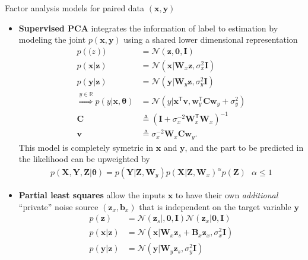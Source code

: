 Factor analysis models for paired data $(\bm{x},\bm{y})$
\begin{itemize}
    \item \textbf{Supervised PCA} integrates the information of label to estimation 
    by modeling the joint $p(\bm{x},\bm{y})$ using a shared lower dimensional representation
    \begin{align}
        p(\bm(z)) 
        & = \mathcal{N}(\bm{z},\mathbf{0},\mathbf{I}) \\
        p(\bm{x}|\bm{z})
        & = \mathcal{N}(\bm{x}|\mathbf{W}_x\bm{z},\sigma_x^2\mathbf{I}) \\
        p(\bm{y}|\bm{z})
        & = \mathcal{N}(\bm{y}|\mathbf{W}_y\bm{z},\sigma_y^2\mathbf{I}) \\
        \overset{y\in\mathbb{R}}{\Rightarrow} 
        p(y|\bm{x},\bm{\theta}) 
        & = \mathcal{N}(y|\bm{x}^\mathsf{T}\bm{v},\bm{w}_y^\mathsf{T}\mathbf{C}\bm{w}_y+\sigma_y^2) \\
        \mathbf{C}
        & \triangleq (\mathbf{I}+\sigma_x^{-2}\mathbf{W}_x^\mathsf{T}\mathbf{W}_x)^{-1} \\
        \bm{v}
        & \triangleq \sigma_x^{-2}\mathbf{W}_x\mathbf{C}\bm{w}_y.
    \end{align}
    This model is completely symetric in $\bm{x}$ and $\bm{y}$, and the part to be predicted in the likelihood can be upweighted by
    \begin{gather}
        p(\mathbf{X}, \mathbf{Y}, \mathbf{Z}|\bm{\theta}) = p(\mathbf{Y}|\mathbf{Z},\mathbf{W}_y)p(\mathbf{X}|\mathbf{Z},\mathbf{W}_x)^\alpha p(\mathbf{Z})~~~\alpha \leq 1
    \end{gather}
    
    \item \textbf{Partial least squares} allow the inputs $\bm{x}$ to have their own \textit{additional} ``private'' noise source $(\bm{z}_x,\bm{b}_x)$ that is independent on the target variable $\bm{y}$
    \begin{align}
        p(\bm{z}) 
        & = \mathcal{N}(\bm{z}_s|,\mathbf{0},\mathbf{I})\mathcal{N}(\bm{z}_x|\mathbf{0},\mathbf{I}) \\
        p(\bm{x}|\bm{z})
        & = \mathcal{N}(\bm{x}|\mathbf{W}_x\bm{z}_s+\mathbf{B}_x\bm{z}_x,\sigma_x^2\mathbf{I}) \\
        p(\bm{y}|\bm{z})
        & = \mathcal{N}(\bm{y}|\mathbf{W}_y\bm{z}_s,\sigma_y^2\mathbf{I})
    \end{align}


\end{itemize}
